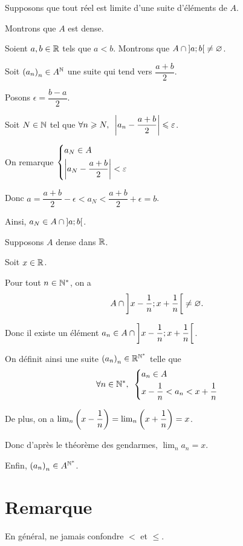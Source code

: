 \begin{dem}
\imprec

Supposons que tout réel est limite d'une suite d'éléments de \(A\).

Montrons que \(A\) est dense.

Soient \(a,b\in\mathbb{R}\) tels que \(a<b\). Montrons que \(A\cap\left]a;b\right[\not=\varnothing\).

Soit \(\left(a_n\right)_n\in A^{\mathbb{N}}\) une suite qui tend vers \(\dfrac{a+b}{2}\).

Posons \(\epsilon=\dfrac{b-a}{2}\).

Soit \(N\in\mathbb{N}\) tel que \(\quantifs{\forall n\geq N}\abs{a_n-\dfrac{a+b}{2}}\leq\epsilon\).

On remarque \(\begin{dcases}a_N\in A \\ \left\lvert a_N-\dfrac{a+b}{2}\right\rvert<\varepsilon\end{dcases}\)

Donc \(a=\dfrac{a+b}{2}-\epsilon<a_N<\dfrac{a+b}{2}+\epsilon=b\).

Ainsi, \(a_N\in A\cap\left]a;b\right[\).

\impdir

Supposons \(A\) dense dans \(\mathbb{R}\).

Soit \(x\in\mathbb{R}\).

Pour tout \(n\in\mathbb{N}^*\), on a \[A\cap\left]x-\dfrac{1}{n};x+\dfrac{1}{n}\right[\not=\varnothing.\]

Donc il existe un élément \(a_n\in A\cap\left]x-\dfrac{1}{n};x+\dfrac{1}{n}\right[\).

On définit ainsi une suite \(\left(a_n\right)_n\in\mathbb{R}^{\mathbb{N}^*}\) telle que \[\quantifs{\forall n\in\Ns}\begin{dcases}a_n\in A \\ x-\dfrac{1}{n}<a_n<x+\dfrac{1}{n}\end{dcases}\]

De plus, on a \(\lim_n\left(x-\dfrac{1}{n}\right)=\lim_n\left(x+\dfrac{1}{n}\right)=x\).

Donc d'après le théorème des gendarmes, \(\lim_na_n=x\).

Enfin, \(\left(a_n\right)_n\in A^{\mathbb{N}^*}\).
\end{dem}

\section{Remarque}

En général, ne jamais confondre \(<\) et \(\leq\).

